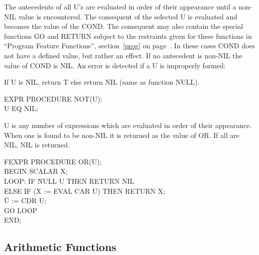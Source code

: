 \documentclass[11pt,letterpaper]{book}
\begin{document}
{The antecedents of all U's are evaluated in order of their appearance
until a non-NIL value is encountered. The consequent of the selected U
is evaluated and becomes the value of the COND. The consequent may
also contain the special functions GO and RETURN subject to the
restraints given for these functions in ``Program Feature Functions'',
section~\ref{prog} on page~\pageref{prog}.
  In these cases COND does
not have a defined value, but rather an effect. If no antecedent is
non-NIL the value of COND is NIL. An error is detected if a U is
improperly formed:

}


{If U is NIL, return T else return NIL (same as function NULL).

{\tt \begin{tabbing} EXPR PROCEDURE NOT(U); \\
\hspace*{1em} U EQ NIL;
\end{tabbing}}
}


{U is any number of expressions which are evaluated in order of their
appearance. When one is found to be non-NIL it is returned as the
value of OR. If all are NIL, NIL is returned.

{\tt \begin{tabbing} FEXPR PROCEDURE OR(U); \\ BEGIN SCALAR X; \\
LOOP: IF \= NULL U THEN RETURN NIL \\
\> ELSE IF (X := EVAL CAR U) THEN RETURN X; \\
\hspace*{2em} \= U := CDR U; \\
\> GO LOOP \\
END;
\end{tabbing} }}


\subsection{Arithmetic Functions}
\end{document}
